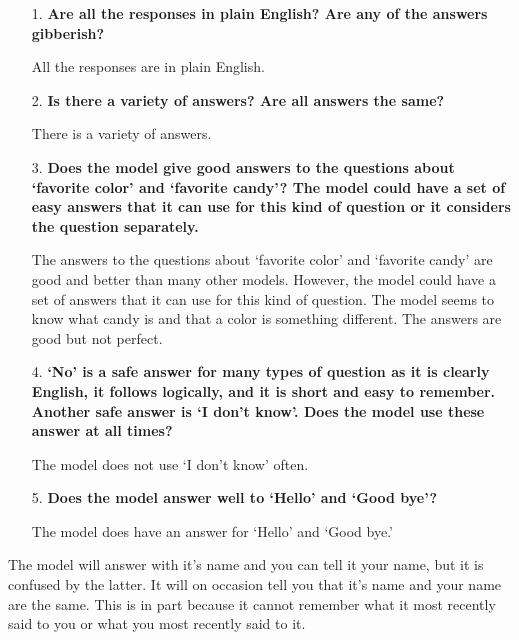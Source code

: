 \begin{itemize}
	\item [1.] \textbf{Are all the responses in plain English? Are any of the answers gibberish?}
	
	\item []All the responses are in plain English. 
	
	\item [2.] \textbf{Is there a  variety of answers? Are all answers the same?}
	
	\item []There is a variety of answers. 
	
	\item [3.] \textbf{Does the model give good answers to the questions about `favorite color' and `favorite candy'? The model could have a set of easy answers that it can use for this kind of question or it considers the question separately. }
	
	\item []The answers to the questions about `favorite color' and `favorite candy' are good and better than many other models. However, the model could have a set of answers that it can use for this kind of question. The model seems to know what candy is and that a color is something different. 
	The answers are good but not perfect.
	
	\item [4.] \textbf{`No' is a safe answer for many types of question as it is clearly English, it follows logically, and it is short and easy to remember. Another safe answer is `I don't know'. Does the model use these answer at all times?}
	
	\item []The model does not use `I don't know' often. 
	
	\item [5.] \textbf{Does the model answer well to `Hello' and `Good bye'?}
	
	\item []The model does have an answer for `Hello' and `Good bye.'
	
\end{itemize}

The model will answer with it's name and you can tell it your name, but it is confused by the latter. It will on occasion tell you that it's name and your name are the same. This is in part because it cannot remember what it most recently said to you or what you most recently said to it. 

